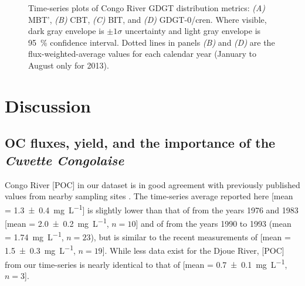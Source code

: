 \begin{figure}[ht]
	\caption[GDGT metric time-series plots]{Time-series plots of Congo River GDGT distribution metrics: \textit{(A)} MBT', \textit{(B)} CBT, \textit{(C)} BIT, and \textit{(D)} GDGT-0/cren. Where visible, dark gray envelope is $\pm 1 \sigma$ uncertainty and light gray envelope is \SI{95}{\%} confidence interval. Dotted lines in panels \textit{(B)} and \textit{(D)} are the flux-weighted-average values for each calendar year (January to August only for 2013).}
	\label{Ch5Fig:4} 
\end{figure}

\section{Discussion}

\subsection{OC fluxes, yield, and the importance of the \textit{Cuvette Congolaise}}

Congo River [POC] in our dataset is in good agreement with previously published values from nearby sampling sites \citep{Mariotti:1991vx,Coynel:2005cn,Spencer:2012en,Spencer:2016ho}. The time-series average reported here [mean = \SI{1.3 \pm 0.4}{mg.L^{-1}}] is slightly lower than that of \citet{Mariotti:1991vx} from the years 1976 and 1983 [mean = \SI{2.0 \pm 0.2}{mg.L^{-1}}, $n = 10$] and of \citet{Coynel:2005cn} from the years 1990 to 1993 (mean = \SI{1.74}{mg.L^{-1}}, $n = 23$), but is similar to the recent measurements of \citet{Spencer:2012en,Spencer:2016ho} [mean = \SI{1.5 \pm 0.3}{mg.L^{-1}}, $n = 19$]. While less data exist for the Djoue River, [POC] from our time-series is nearly identical to that of \citet{Mariotti:1991vx} [mean = \SI{0.7 \pm 0.1}{mg.L^{-1}}, $n = 3$].

